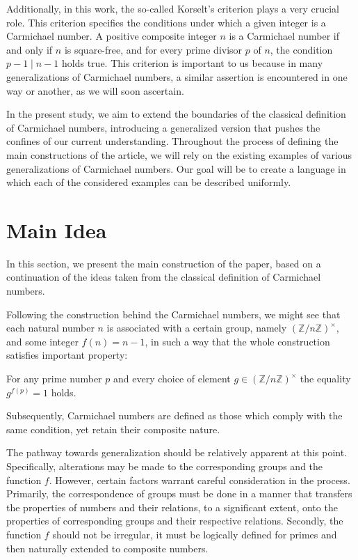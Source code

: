 \documentclass{article}
\theoremstyle{definition}
\theoremstyle{definition}
\begin{document}
Additionally, in this work, the so-called Korselt's criterion plays a very crucial role. This criterion specifies the conditions 
under which a given integer is a Carmichael number. A positive composite integer $n$ is a Carmichael number if and only if $n$ is 
square-free, and for every prime divisor $p$ of $n$, the condition $p-1 \mid n-1$ holds true. This criterion is important to us 
because in many generalizations of Carmichael numbers, a similar assertion is encountered in one way or another, as we will soon 
ascertain.

In the present study, we aim to extend the boundaries of the classical definition of Carmichael numbers, introducing a generalized 
version that pushes the confines of our current understanding. Throughout the process of defining the main constructions of the 
article, we will rely on the existing examples of various generalizations of Carmichael numbers. Our goal will be to create a 
language in which each of the considered examples can be described uniformly.

\newpage



\section {Main Idea}
In this section, we present the main construction of the paper, based on a continuation of the ideas taken from the classical 
definition of Carmichael numbers.

Following the construction behind the Carmichael numbers, we might see that each natural number $n$ is associated with a certain 
group, namely $(\mathbb{Z}/n\mathbb{Z})^\times$, and some integer $f(n)=n-1$, in such a way that the whole construction satisfies 
important property:
\begin{center}
    For any prime number $p$ and every choice of element $g \in (\mathbb{Z}/n\mathbb{Z})^\times$ the equality $g^{f(p)}=1$ holds.
\end{center}
Subsequently, Carmichael numbers are defined as those which comply with the same condition, yet retain their composite nature.

The pathway towards generalization should be relatively apparent at this point. Specifically, alterations may be made to the 
corresponding groups and the function $f$. However, certain factors warrant careful consideration in the process. Primarily, 
the correspondence of groups must be done in a manner that transfers the properties of numbers and their relations, to a significant 
extent, onto the properties of corresponding groups and their respective relations. Secondly, the function $f$ should not be 
irregular, it must be logically defined for primes and then naturally extended to composite numbers.
\end{document}

